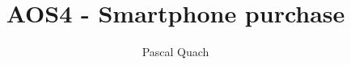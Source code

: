 \documentclass[answers, 10pt]{exam}
\begin{document}
\title{AOS4 - Smartphone purchase}
\author{Pascal Quach}
\maketitle

\lipsum[1]

\begin{questions}
	\question 
	\begin{solutionorbox}
	\end{solutionorbox}
\end{questions}
\end{document}
